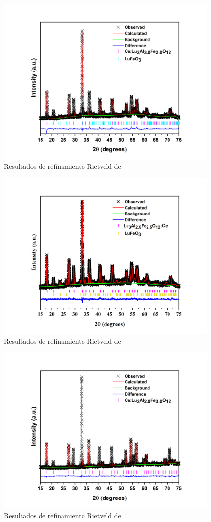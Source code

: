 \begin{appendix}
	\begin{figure}[h]
		\centering%
		\includegraphics[width=11cm]{Anexos/x20.png}%
		\caption{Resultados de refinamiento Rietveld de
		}\label{fig:refi20}
	\end{figure}

	\begin{figure}[h]
		\centering%
		\includegraphics[width=11cm]{Anexos/x25.png}%
		\caption{Resultados de refinamiento Rietveld de
		}\label{fig:refi25}
	\end{figure}

	\begin{figure}[h]
		\centering%
		\includegraphics[width=11cm]{Anexos/x30.png}%
		\caption{Resultados de refinamiento Rietveld de
		}\label{fig:refi30}
	\end{figure}


\end{appendix}
